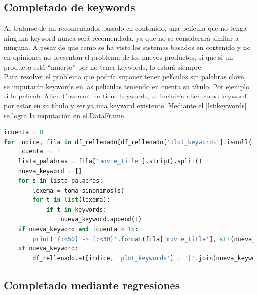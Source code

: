 \subsection{Completado de keywords}

Al tratarse de un recomendador basado en contenido, una película que no tenga ninguna keyword nunca será recomendada, ya que no se considerará similar a ninguna. A pesar de que como se ha visto los sistemas basados en contenido y no en opiniones no presentan el problema de los nuevos productos, si que si un producto está ``muerto'' por no tener keywords, lo estará siempre.\\

Para resolver el problema que podría suponer tener películas sin palabras clave, se imputarán keywords en las películas teniendo en cuenta su título. Por ejemplo si la película Alien Covenant no tiene keywords, se incluiría alien como keyword por estar en su título y ser ya una keyword existente. Mediante el \autoref{lst:keywords} se logra la imputación en el DataFrame.

\begin{lstlisting}[language=Python, caption={Imputación de keywords a partir del título de la película. Al tratarse de un motor de recomendación basado en contenido, si una película no contiene keywords, será muy complicado que termine siendo recomendada. Para ello, en un intento de que todas las películas tengan keywords, se utiliza su título como fuente de keywords, tomando del mismo las palabras que ya sean keywords de otra película. Este método puede traer asociado algun probelma. Sin embargo, consideramos que es la forma más directa de asociar keywords a una película.}, label ={lst:keywords}]
icuenta = 0
for indice, fila in df_rellenado[df_rellenado['plot_keywords'].isnull()].iterrows():
    icuenta += 1
    lista_palabras = fila['movie_title'].strip().split()
    nueva_keyword = []
    for s in lista_palabras:
        lexema = toma_sinonimos(s)
        for t in list(lexema):
            if t in keywords: 
                nueva_keyword.append(t)                
    if nueva_keyword and icuenta < 15: 
        print('{:<50} -> {:<30}'.format(fila['movie_title'], str(nueva_keyword)))
    if nueva_keyword:
        df_rellenado.at[indice, 'plot_keywords'] = '|'.join(nueva_keyword)
\end{lstlisting}

\subsection{Completado mediante regresiones}

